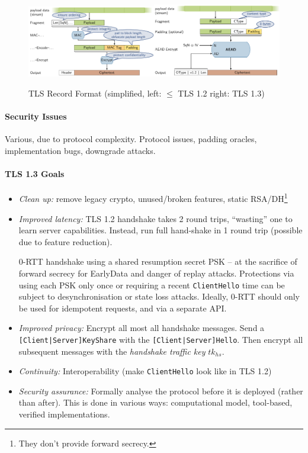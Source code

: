 \begin{figure}[h]
    \centering
	\includegraphics[width=0.5\textwidth]{images/tls-record-12.png}\includegraphics[width=0.5\textwidth]{images/tls-record-13.png}
    \caption{TLS Record Format (simplified, left: $\leq$ TLS 1.2 right: TLS 1.3)}
    \label{fig:tls-record}
\end{figure}

\paragraph{Security Issues}
Various, due to protocol complexity.
Protocol issues, padding oracles, implementation bugs, downgrade attacks.

\paragraph{TLS 1.3 Goals}
\begin{itemize}
\item \emph{Clean up:}
remove legacy crypto, unused/broken features, static RSA/DH\footnote{They don't provide forward secrecy.}
\item \emph{Improved latency:}
TLS 1.2 handshake takes 2 round trips, ``wasting'' one to learn server capabilities.
Instead, run full hand-shake in 1 round trip (possible due to feature reduction).

0-RTT handshake using a shared resumption secret PSK
-- at the sacrifice of forward secrecy for EarlyData and danger of replay attacks.
Protections via using each PSK only once or requiring a recent \texttt{ClientHello}
time can be subject to desynchronisation or state loss attacks.
Ideally, 0-RTT should only be used for idempotent requests, and via a separate API.
\item \emph{Improved privacy:}
Encrypt all most all handshake messages.
Send a \texttt{[Client|Server]KeyShare} with the \texttt{[Client|Server]Hello}.
Then encrypt all subsequent messages with the \emph{handshake traffic key} $tk_{hs}$.
\item \emph{Continuity:}
Interoperability (make \texttt{ClientHello} look like in TLS 1.2)
\item \emph{Security assurance:}
Formally analyse the protocol before it is deployed (rather than after).
This is done in various ways: computational model, tool-based, verified implementations.
\end{itemize}

